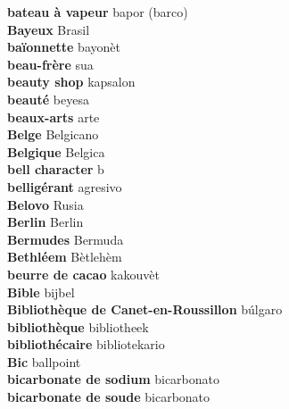 \textbf{ bateau à vapeur  } bapor (barco) \\
\textbf{ Bayeux  } Brasil \\
\textbf{ baïonnette  } bayonèt \\
\textbf{ beau-frère  } sua \\
\textbf{ beauty shop  } kapsalon \\
\textbf{ beauté  } beyesa \\
\textbf{ beaux-arts  } arte \\
\textbf{ Belge  } Belgicano \\
\textbf{ Belgique  } Belgica \\
\textbf{ bell character  } b \\
\textbf{ belligérant  } agresivo \\
\textbf{ Belovo  } Rusia \\
\textbf{ Berlin  } Berlin \\
\textbf{ Bermudes  } Bermuda \\
\textbf{ Bethléem  } Bètlehèm \\
\textbf{ beurre de cacao  } kakouvèt \\
\textbf{ Bible  } bijbel \\
\textbf{ Bibliothèque de Canet-en-Roussillon  } búlgaro \\
\textbf{ bibliothèque  } bibliotheek \\
\textbf{ bibliothécaire  } bibliotekario \\
\textbf{ Bic  } ballpoint \\
\textbf{ bicarbonate de sodium  } bicarbonato \\
\textbf{ bicarbonate de soude  } bicarbonato \\
